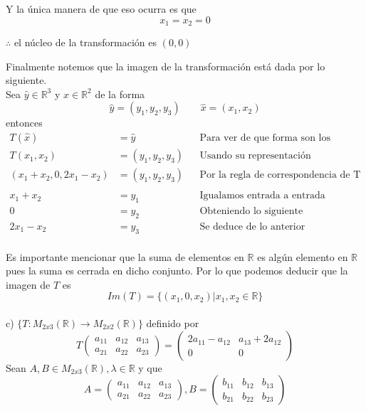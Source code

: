 \documentclass[letterpaper]{article}
\newcommand{\R}{\mathds{R}}
\renewcommand{\*}{\cdot}
\theoremstyle{definition}
\begin{document}
	Y la única manera de que eso ocurra es que 
	\[ x_1 = x_2 = 0 \]
	\begin{center}	 
		$ \therefore $ el núcleo de la transformación es $ (0,0) $
	\end{center}
	
		Finalmente notemos que la imagen de la transformación está dada por lo siguiente.\\
		Sea $ \hat{y} \in \R^3  $ y $ \hat{x} \in \R^2 $ de la forma 
		\[\hat{y} = (y_1, y_2, y_3) \qquad \hat{x} = (x_1, x_2) \]
		entonces
		\begin{align*}
		T(\hat{x}) &= \hat{y} && \text{Para ver de que forma son los elementos}\\
		T(x_1, x_2) &= (y_1, y_2, y_3) && \text{Usando su representación}\\
		(x_1 + x_2, 0, 2x_1 - x_2 ) &= (y_1, y_2, y_3) && \text{Por la regla de correspondencia de T}\\
		\\
		x_1 + x_2 &= y_1 && \text{Igualamos entrada a entrada}\\
		0 &= y_2 && \text{Obteniendo lo siguiente}\\
		2x_1 - x_2  &= y_3 && \text{Se deduce de lo anterior}\\
		\end{align*}
		
		Es importante mencionar que la suma de elementos en $ \R $ es algún elemento en $ \R $ pues la suma es cerrada en dicho conjunto. Por lo que podemos deducir que la imagen de $ T $ es $$ Im(T) = \lbrace (x_1, 0 , x_2)| x_1, x_2 \in \R \rbrace $$\\
		
	c) $\lbrace T: M_{2x3}(\mathbb{R}) \longrightarrow M_{2x2}(\mathbb{R}) \rbrace $ definido por
	\[ T \begin{pmatrix} a_{11} & a_{12} & a_{13} \\ a_{21} & a_{22} & a_{23} \end{pmatrix} = \begin{pmatrix} 2a_{11} - a_{12} & a_{13} + 2a_{12} \\ 0 & 0 \end{pmatrix} \]
	Sean $ A,B \in  M_{2x3}(\mathbb{R}), \lambda \in \R $ y que 
	\[ A = \begin{pmatrix}
		a_{11} & a_{12} & a_{13}\\
		a_{21} & a_{22} & a_{23}
	\end{pmatrix}, B = \begin{pmatrix}
		b_{11} & b_{12} & b_{13}\\
		b_{21} & b_{22} & b_{23}
	\end{pmatrix} \]
	
\end{document}
